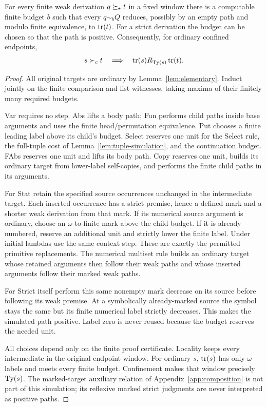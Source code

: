 \begin{lemma}\label{lem:positive-simulation}
For every finite weak derivation $q\succeq_\star t$ in a fixed window there is
a computable finite budget $b$ such that every $q\sim_b Q$ reduces,
possibly by an empty path and modulo finite equivalence, to $\operatorname{tr}(t)$.
For a strict derivation the budget can be chosen so that the path is
positive. Consequently, for ordinary confined endpoints,
\[
 s\succ_c t\quad\Longrightarrow\quad
 \operatorname{tr}(s)R_{\operatorname{Ty}(s)}\operatorname{tr}(t).
\]
\end{lemma}
\begin{proof}
All original targets are ordinary by Lemma~\ref{lem:elementary}.
Induct jointly on the finite comparison and list witnesses, taking
maxima of their finitely many required budgets.

Var requires no step. Abs lifts a body path; Fun performs child paths
inside base arguments and uses the finite head/permutation equivalence.
Put chooses a finite leading label above its child's budget.
Select reserves one unit for the Select rule, the full-tuple cost
of Lemma~\ref{lem:tuple-simulation}, and the continuation budget.
FAbs reserves one unit and lifts its body path. Copy reserves one
unit, builds its ordinary target from lower-label self-copies, and
performs the finite child paths in its arguments.

For Stat retain the specified source occurrences unchanged in the
intermediate target. Each inserted occurrence has a strict premise,
hence a defined mark and a shorter weak derivation from that mark.
If its numerical source argument is ordinary, choose an
$\omega$-to-finite mark above the child budget. If it is already
numbered, reserve an additional unit and strictly lower the finite
label. Under initial lambdas use the same context step. These are
exactly the permitted primitive replacements. The numerical multiset
rule builds an ordinary target whose retained arguments then follow
their weak paths and whose inserted arguments follow their marked
weak paths.

For Strict itself perform this same nonempty mark decrease on its
source before following its weak premise. At a symbolically
already-marked source the symbol stays the same but its finite
numerical label strictly decreases. This makes the simulated path positive. Label zero
is never reused because the budget reserves the needed unit.

All choices depend only on the finite proof certificate. Locality
keeps every intermediate in the original endpoint window. For
ordinary $s$, $\operatorname{tr}(s)$ has only $\omega$ labels and meets every
finite budget. Confinement makes that window precisely $\operatorname{Ty}(s)$.
The marked-target auxiliary relation of Appendix~\ref{app:composition}
is not part of this simulation; its reflexive marked strict judgments
are never interpreted as positive paths.
\end{proof}

